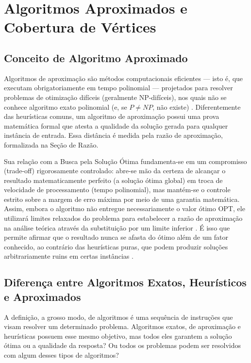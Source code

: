

\chapter{Algoritmos Aproximados e Cobertura de Vértices}
\section{Conceito de Algoritmo Aproximado}

Algoritmos de aproximação são métodos computacionais eficientes — isto é, que executam obrigatoriamente em tempo polinomial — projetados para resolver problemas de otimização difíceis (geralmente NP-difíceis), nos quais não se conhece algoritmo exato polinomial (e, se $P \neq NP$, não existe) \cite{fernandes2021}. Diferentemente das heurísticas comuns, um algoritmo de aproximação possui uma prova matemática formal que atesta a qualidade da solução gerada para qualquer instância de entrada. Essa distância é medida pela razão de aproximação, formalizada na Seção de Razão.

Sua relação com a Busca pela Solução Ótima fundamenta-se em um compromisso (trade-off) rigorosamente controlado: abre-se mão da certeza de alcançar o resultado matematicamente perfeito (a solução ótima global) em troca de velocidade de processamento (tempo polinomial), mas mantém-se o controle estrito sobre a margem de erro máxima por meio de uma garantia matemática. Assim, embora o algoritmo não entregue necessariamente o valor ótimo OPT, ele utilizará limites relaxados do problema para estabelecer a razão de aproximação na análise teórica através da substituição por um limite inferior \cite{quora_approx_heuristic}. É isso que permite afirmar que o resultado nunca se afasta do ótimo além de um fator conhecido, ao contrário das heurísticas puras, que podem produzir soluções arbitrariamente ruins em certas instâncias \cite{miyazawa_aprox}.

\section{Diferença entre Algoritmos Exatos, Heurísticos e Aproximados}
\label{sec:diferenca}

A definição, a grosso modo, de algoritmos é uma sequência de instruções que visam resolver um determinado problema. Algoritmos exatos, de aproximação e heurísticas possuem esse mesmo objetivo, mas todos eles garantem a solução ótima ou a qualidade da resposta? Ou todos os problemas podem ser resolvidos com algum desses tipos de algoritmos?


